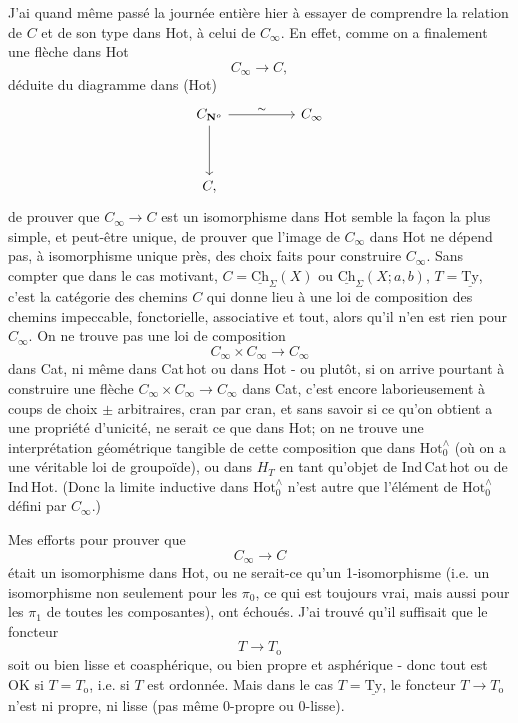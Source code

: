\documentclass[11pt]{article}
\newcommand{\printedpage}[1]{\marginpar{\footnotesize p.~#1}}
\newcommand{\msp}[1]{\marginpar{\footnotesize [#1]}}
\newcommand{\Ch}{\underline{\mathrm{Ch}}}
\newcommand{\Ty}{\underline{\mathrm{Ty}}}
\newcommand{\Hotz}{\mathrm{Hot}^{\wedge}_{0}}
\newcommand{\CNo}{C_{\mathbf{N}^{o}}}
\begin{document}
J'ai quand même passé la journée entière hier à essayer de comprendre la relation de $C$ et de son type dans Hot, à celui de $C_{\infty}$. En effet, comme on a finalement une flèche dans Hot
\[
C_{\infty} \longrightarrow C,
\]
déduite du diagramme dans (Hot)
\[
\begin{tikzcd}[column sep=huge, row sep=huge]
\CNo \arrow[r, "\sim"] \arrow[d] & C_{\infty} \\
C, &
\end{tikzcd}
\]
de prouver que $C_{\infty} \longrightarrow C$ est un isomorphisme dans Hot
\msp{page 111}
semble la façon la plus simple, et peut-être unique, de prouver que l'image de $C_{\infty}$ dans Hot ne dépend pas, à isomorphisme unique près, des choix faits pour construire $C_{\infty}$. Sans compter que dans le cas motivant, $C = \Ch_{\Sigma}(X)$ ou $\Ch_{\Sigma}(X;a,b)$, $T = \Ty$, c'est la catégorie des chemins $C$ qui donne lieu à une loi de composition des chemins impeccable, fonctorielle, associative et tout, alors qu'il n'en est rien pour $C_{\infty}$. On ne trouve pas une loi de composition
\[
C_{\infty} \times C_{\infty} \longrightarrow C_{\infty}
\]
dans Cat, ni même dans Cat\,hot ou dans Hot - ou plutôt, si on arrive pourtant à construire une flèche $C_{\infty} \times C_{\infty} \longrightarrow C_{\infty}$ dans Cat, c'est encore laborieusement à coups de choix $\pm$ arbitraires, cran par cran, et sans savoir si ce qu'on obtient a une propriété d'unicité, ne serait ce que dans Hot; on ne trouve une interprétation géométrique tangible de cette composition que dans $\Hotz$ (où on a une véritable loi de groupoïde), ou dans $H_{T}$ en tant qu'objet de Ind\,Cat\,hot
\printedpage{71}
\msp{page 112}
ou de Ind\,Hot. (Donc la limite inductive dans $\Hotz$ n'est autre que l'élément de $\Hotz$ défini par $C_{\infty}$.)

Mes efforts pour prouver que
\[
C_{\infty} \longrightarrow C
\]
était un isomorphisme dans Hot, ou ne serait-ce qu'un 1-isomorphisme (i.e. un isomorphisme non seulement pour les $\pi_{0}$, ce qui est toujours vrai, mais aussi pour les $\pi_{1}$ de toutes les composantes), ont échoués. J'ai trouvé qu'il suffisait que le foncteur %
\[
T \longrightarrow T_{\mathrm{o}}
\]
soit ou bien lisse et coasphérique, ou bien propre et asphérique - donc tout est OK si $T = T_{\mathrm{o}}$, i.e. si $T$ est ordonnée. Mais dans le cas $T = \Ty$, le foncteur $T \longrightarrow T_{\mathrm{o}}$ n'est ni propre, ni lisse (pas même 0-propre ou 0-lisse).
\end{document}
